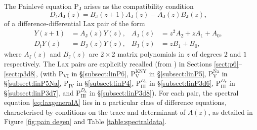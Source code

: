 \documentclass[a4paper,reqno]{amsart}
\numberwithin{equation}{section}
\numberwithin{figure}{section}
\theoremstyle{remark}
\newcommand\Pthree{\textrm{P}_{\textrm{III}}}
\newcommand\Pfour{\textrm{P}_{\textrm{IV}}}
\newcommand\Pfive{\textrm{P}_{\textrm{V}}}
\newcommand\Psix{\textrm{P}_{\textrm{VI}}}
\newcommand\PJ{\textrm{P}_{\textrm{J}}}
\begin{document}
The Painlev\'e equation $\PJ$
arises as the compatibility condition
\begin{equation*}
    D_t A_\textrm{J}(z)=B_\textrm{J}(z+1)A_\textrm{J}(z)-A_\textrm{J}(z)B_\textrm{J}(z),
\end{equation*}
of a difference-differential Lax pair of the form 
\begin{subequations}\label{eq:laxgeneral}
\begin{align}
Y(z+1)&=A_\textrm{J}(z)Y(z), & A_\textrm{J}(z)&=z^2A_2+zA_1+A_0,\label{eq:laxgeneralA}\\
    D_t Y(z)&=B_\textrm{J}(z)Y(z),  & B_\textrm{J}(z)&=zB_1+B_0,\label{eq:laxgeneralB}
\end{align}
\end{subequations}
where $A_\textrm{J}(z)$ and $B_\textrm{J}(z)$ are $2\times 2$ matrix polynomials in $z$ of degrees $2$ and $1$ respectively.  The Lax pairs are explicitly recalled (from \cites{adler94,nakazono_lax,KNY2017,ormerodrains2017}) in Sections \ref{sect:p6}--\ref{sect:p3d8}, (with $\Psix$ in \S\ref{subsect:linP6}, $\Pfive^\text{KNY}$  in \S\ref{subsect:linP5}, $\Pfive^\text{Na}$  in \S\ref{subsect:linP5Na}, $\Pfour$ in \S\ref{subsect:linP4}, $\Pthree^{D_6}$ in \S\ref{subsect:linP3d6}, $\Pthree^{D_7}$ in \S\ref{subsect:linP3d7}, and $\Pthree^{D_8}$ in \S\ref{subsect:linP3d8}). 
For each pair, the spectral equation \eqref{eq:laxgeneralA} lies in a particular class of difference equations, characterised by conditions on the trace and determinant of $A(z)$, as detailed in Figure \ref{fig:pain degen} and Table \ref{table:spectraldata}. 
\end{document}
